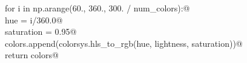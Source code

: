 \documentclass[12.0pt]{report}
\begin{document}
\begin{appendices}
\begin{flushleft}
\begin{list}{}{}
\mbox{}\verb@    for i in np.arange(60., 360., 300. / num_colors):@\\
\mbox{}\verb@        hue        = i/360.0@\\
\mbox{}\verb@        saturation = 0.95@\\
\mbox{}\verb@        colors.append(colorsys.hls_to_rgb(hue, lightness, saturation))@\\
\mbox{}\verb@    return colors@\\
\mbox{}\verb@@{\NWsep}
\end{list}
\vspace{-1.5ex}
\footnotesize
\begin{list}{}{\setlength{\itemsep}{-\parsep}\setlength{\itemindent}{-\leftmargin}}

\item{}
\end{list}
\vspace{4ex}
\end{flushleft}
\end{appendices}
\end{document}
